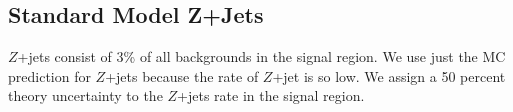 
\subsection{Standard Model Z+Jets}
\label{sec:Bkg:zjet}

\indent $Z$+jets consist of 3\% of all backgrounds in the signal region.   We use just the MC prediction for $Z$+jets because the rate of $Z$+jet is so low.  We assign a 50 percent theory uncertainty to the $Z$+jets rate in the signal region.  \\


